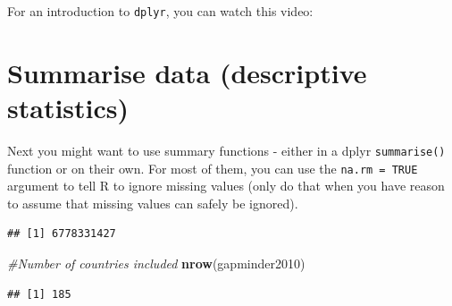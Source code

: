 \documentclass[
]{book}
\newenvironment{Shaded}{\begin{snugshade}}{\end{snugshade}}
\newcommand{\CommentTok}[1]{\textcolor[rgb]{0.56,0.35,0.01}{\textit{#1}}}
\newcommand{\DataTypeTok}[1]{\textcolor[rgb]{0.13,0.29,0.53}{#1}}
\newcommand{\DecValTok}[1]{\textcolor[rgb]{0.00,0.00,0.81}{#1}}
\newcommand{\KeywordTok}[1]{\textcolor[rgb]{0.13,0.29,0.53}{\textbf{#1}}}
\newcommand{\NormalTok}[1]{#1}
\newcommand{\OperatorTok}[1]{\textcolor[rgb]{0.81,0.36,0.00}{\textbf{#1}}}
\newcommand{\OtherTok}[1]{\textcolor[rgb]{0.56,0.35,0.01}{#1}}
\newcommand{\StringTok}[1]{\textcolor[rgb]{0.31,0.60,0.02}{#1}}
\begin{document}
For an introduction to \texttt{dplyr}, you can watch this video:

\hypertarget{summarise-data-descriptive-statistics}{%
\section{Summarise data (descriptive statistics)}\label{summarise-data-descriptive-statistics}}

Next you might want to use summary functions - either in a dplyr \texttt{summarise()} function or on their own. For most of them, you can use the \texttt{na.rm\ =\ TRUE} argument to tell R to ignore missing values (only do that when you have reason to assume that missing values can safely be ignored).

\begin{Shaded}
\end{Shaded}

\begin{verbatim}
## [1] 6778331427
\end{verbatim}

\begin{Shaded}
\begin{Highlighting}[]
\CommentTok{#Number of countries included}
\KeywordTok{nrow}\NormalTok{(gapminder2010)}
\end{Highlighting}
\end{Shaded}

\begin{verbatim}
## [1] 185
\end{verbatim}

\begin{Shaded}
\end{Shaded}
\end{document}

